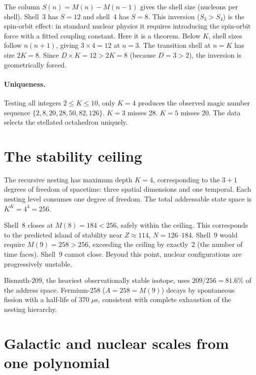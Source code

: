 \documentclass[twocolumn]{iopjournal}
\begin{document}
The column $S(n) = M(n) - M(n{-}1)$ gives the shell size
(nucleons per shell). Shell~3 has $S = 12$ and shell~4 has
$S = 8$. This inversion ($S_3 > S_4$) is the spin-orbit effect:
in standard nuclear physics it requires introducing the spin-orbit
force with a fitted coupling constant.
Here it is a theorem.
Below $K$, shell sizes follow $n(n{+}1)$, giving $3 \times 4 = 12$
at $n = 3$. The transition shell at $n = K$ has size $2K = 8$.
Since $D \times K = 12 > 2K = 8$ (because $D = 3 > 2$), the
inversion is geometrically forced.

\paragraph{Uniqueness.}
Testing all integers $2 \leq K \leq 10$, only $K = 4$ produces
the observed magic number sequence
$\{2, 8, 20, 28, 50, 82, 126\}$.
$K = 3$ misses 28.
$K = 5$ misses 20.
The data selects the stellated octahedron uniquely.


\section{The stability ceiling}

The recursive nesting has maximum depth $K = 4$, corresponding to
the $3 + 1$ degrees of freedom of spacetime: three spatial
dimensions and one temporal. Each nesting level consumes one
degree of freedom.
The total addressable state space is $K^K = 4^4 = 256$.

Shell~8 closes at $M(8) = 184 < 256$, safely within the ceiling.
This corresponds to the predicted island of stability near
$Z \approx 114$, $N = 126$--$184$.
Shell~9 would require $M(9) = 258 > 256$, exceeding the ceiling
by exactly~2 (the number of time faces).
Shell~9 cannot close.
Beyond this point, nuclear configurations are progressively
unstable.

Bismuth-209, the heaviest observationally stable isotope, uses
$209/256 = 81.6\%$ of the address space.
Fermium-258 ($A = 258 = M(9)$) decays by spontaneous fission
with a half-life of $370\;\mu$s, consistent with complete
exhaustion of the nesting hierarchy.


\section{Galactic and nuclear scales from one polynomial}
\end{document}
